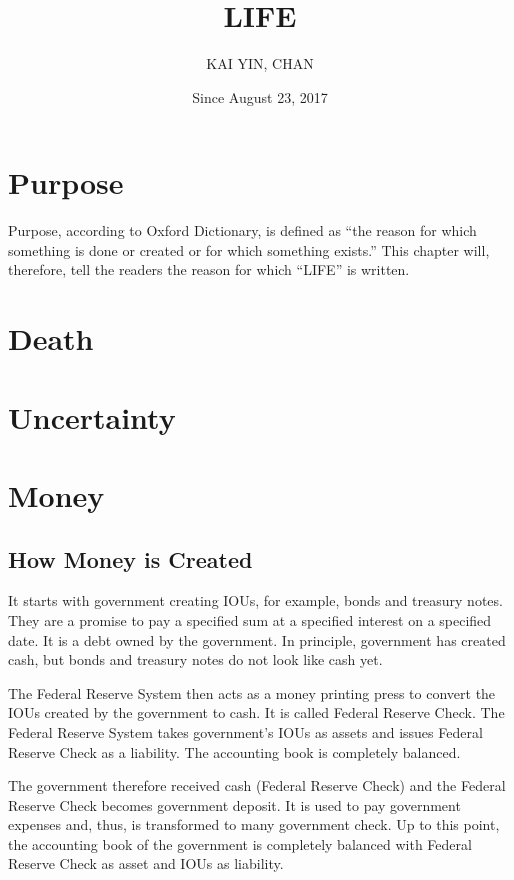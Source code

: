 \documentclass[a4paper]{report}
\begin{document}
\title{LIFE}
\author{KAI YIN, CHAN}
\date{Since August 23, 2017}
\maketitle

\chapter{Purpose}
Purpose, according to Oxford Dictionary, is defined as ``the reason for which something is done or created or for which something exists.'' This chapter will, therefore, tell the readers the reason for which ``LIFE'' is written.

\chapter{Death}

\chapter{Uncertainty}

\chapter{Money}
\section{How Money is Created}
It starts with government creating IOUs, for example, bonds and treasury notes. They are a promise to pay a specified sum at a specified interest on a specified date. It is a debt owned by the government. In principle, government has created cash, but bonds and treasury notes do not look like cash yet.

The Federal Reserve System then acts as a money printing press to convert the IOUs created by the government to cash. It is called Federal Reserve Check. The Federal Reserve System takes government's IOUs as assets and issues Federal Reserve Check as a liability. The accounting book is completely balanced.

The government therefore received cash (Federal Reserve Check) and the Federal Reserve Check becomes government deposit. It is used to pay government expenses and, thus, is transformed to many government check. Up to this point, the accounting book of the government is completely balanced with Federal Reserve Check as asset and IOUs as liability.
\end{document}

